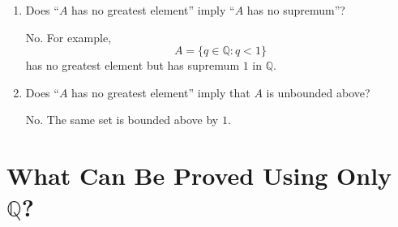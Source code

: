 \documentclass{self-check}
\begin{document}
\begin{enumerate}[label=\arabic*., itemsep=10pt]
\begin{answer}
If $\mathbb{R}$ is being constructed from cuts, using completeness of $\mathbb{R}$ to define or justify the cuts assumes the object being constructed.
\end{answer}

\item Does ``$A$ has no greatest element'' imply ``$A$ has no supremum''?

\begin{answer}
No. For example,
\[
A=\{q\in\mathbb{Q}:q<1\}
\]
has no greatest element but has supremum $1$ in $\mathbb{Q}$.
\end{answer}

\item Does ``$A$ has no greatest element'' imply that $A$ is unbounded above?

\begin{answer}
No. The same set is bounded above by $1$.
\end{answer}

\end{enumerate}

\section{What Can Be Proved Using Only \texorpdfstring{$\mathbb{Q}$}{Q}?}
\end{document}
